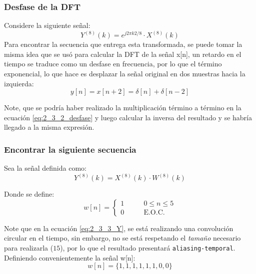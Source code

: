 			\subsubsection{Desfase de la DFT}
				Considere la siguiente señal:
					\begin{equation}
						Y^{(8)}(k) = e^{j2\pi k 2 / 8} \cdot X^{(8)}(k)
						\label{eq:2_3_2_desfase}
					\end{equation}
				Para encontrar la secuencia que entrega esta transformada, se puede tomar la misma idea que se usó para calcular la DFT de la señal x[n], un retardo en el tiempo se traduce como un desfase en frecuencia, por lo que el término exponencial, lo que hace es desplazar la señal original en dos muestras hacia la izquierda:
				\begin{equation}
					y[n] = x[n + 2] = \delta[n] + \delta[n-2]
				\end{equation}
				
				Note, que se podría haber realizado la multiplicación término a término en la ecuación \ref{eq:2_3_2_desfase} y luego calcular la inversa del resultado y se habría llegado a la misma expresión. 
			
			\subsubsection{Encontrar la siguiente secuencia}
				Sea la señal definida como:
				\begin{equation}
					Y^{(8)}(k) = X^{(8)}(k) \cdot W^{(8)}(k)
					\label{eq:2_3_3_Y}
				\end{equation}
				
				Donde se define:
				\begin{equation}
				w[n] = \begin{cases}
							1  & \qquad 0 \leq n \leq 5 \\
							0  & \qquad \text{E.O.C.}
						\end{cases}
				\end{equation}
				
				Note que en la ecuación \ref{eq:2_3_3_Y}, se está realizando una convolución circular en el tiempo, sin embargo, no se está respetando el \textit{tamaño} necesario para realizarla ($ 15 $), por lo que el resultado presentará \texttt{aliasing-temporal}. Definiendo convenientemente la señal w[n]:
				 \begin{equation*}
				 	w[n] = \{1,1,1,1,1,1,0,0\}
				 \end{equation*}
				 
